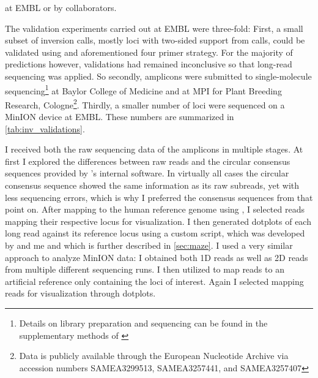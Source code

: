 \begin{table}[ht]
\begin{adjustbox}{inner,minipage=[b]{\textplusmargin}}
\begin{minipage}[t]{0.54\textplusmargin}
{                at EMBL or by collaborators.}
            \end{minipage}
            \hspace{0.04\textplusmargin}
            \begin{minipage}[t]{0.42\textplusmargin}
                \centering
            \end{minipage}
        \end{adjustbox}
\end{table}

The validation experiments carried out at EMBL were three-fold: First, a small
subset of inversion calls, mostly loci with two-sided support from \delly calls,
could be validated using \pcr and aforementioned four primer strategy. For the
majority of predictions however, \pcr validations had remained inconclusive so
that long-read sequencing was applied. So secondly, amplicons were submitted to
\pacbio single-molecule sequencing\footnote{\label{footnote:xbpIhd}Details on
library preparation and sequencing can be found in the supplementary methods of
\cite{Sudmant2015}} at Baylor College of Medicine and at MPI for Plant Breeding
Research, Cologne\footnote{Data is publicly available through the European
Nucleotide Archive via accession numbers SAMEA3299513, SAMEA3257441, and
SAMEA3257407}. Thirdly, a smaller number of loci were sequenced on a
\ont MinION device at EMBL. These numbers are
summarized in \cref{tab:inv_validations}.

I received both the raw sequencing data of the amplicons in multiple stages. At
first I explored the differences between raw \pacbio reads and the circular
consensus sequences provided by \pacbio’s internal software. In virtually all
cases the circular consensus sequence showed the same information as its raw
subreads, yet with less sequencing errors, which is why I preferred the
consensus sequences from that point on. After mapping to the human reference
genome using \blasr, I selected reads mapping their respective locus for
visualization. I then generated dotplots of each long read against its reference
locus using a custom script, which was developed by \markus and me and which is
further described in \cref{sec:maze}. I used a very similar approach to analyze
\ont MinION data: I obtained both 1D reads as well as 2D reads from multiple
different sequencing runs. I then utilized \last to map reads to an artificial
reference only containing the loci of interest. Again I selected mapping reads
for visualization through dotplots.


